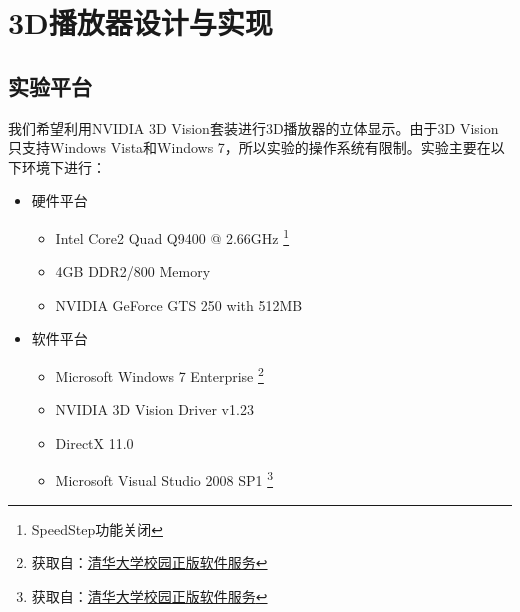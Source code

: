 

\chapter{3D播放器设计与实现}
\label{cha:3Dplayerdesignandrealization}

\section{实验平台}
\label{sec:3dplayerhardwareplatform}



我们希望利用NVIDIA 3D Vision套装进行3D播放器的立体显示。由于3D Vision只支持Windows Vista和Windows 7，所以实验的操作系统有限制。实验主要在以下环境下进行：

\begin{itemize}
\item {硬件平台}

\begin{itemize}
\item Intel Core2 Quad Q9400 @ 2.66GHz
	\footnote{SpeedStep功能关闭}
\item 4GB DDR2/800 Memory
\item NVIDIA GeForce GTS 250 with 512MB
\end{itemize}

\item {软件平台}

\begin{itemize}
\item Microsoft Windows 7 Enterprise
	\footnote{获取自：\href{http://helpdesk.tsinghua.edu.cn/yhfw/yhfw_zbrj_tz.jsp}{清华大学校园正版软件服务}}
\item NVIDIA 3D Vision Driver v1.23
\item DirectX 11.0
\item Microsoft Visual Studio 2008 SP1
	\footnote{获取自：\href{http://helpdesk.tsinghua.edu.cn/yhfw/yhfw_zbrj_tz.jsp}{清华大学校园正版软件服务}}
\end{itemize}

\end{itemize}


